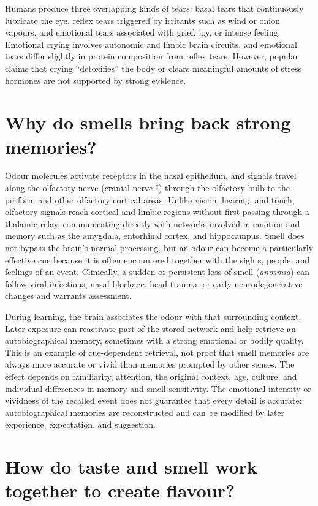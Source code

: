 \documentclass[11pt,oneside]{report}
\begin{document}
Humans produce three overlapping kinds of tears: basal tears that continuously
lubricate the eye, reflex tears triggered by irritants such as wind or onion
vapours, and emotional tears associated with grief, joy, or intense feeling.
Emotional crying involves autonomic and limbic brain circuits, and emotional
tears differ slightly in protein composition from reflex tears. However, popular
claims that crying ``detoxifies'' the body or clears meaningful amounts of
stress hormones are not supported by strong evidence.

\section{Why do smells bring back strong memories?}

Odour molecules activate receptors in the nasal epithelium, and signals travel
along the olfactory nerve (cranial nerve I) through the olfactory bulb to the
piriform and other olfactory cortical areas. Unlike vision, hearing, and touch,
olfactory signals reach cortical and limbic regions without first passing
through a thalamic relay, communicating directly with networks involved in
emotion and memory such as the amygdala, entorhinal cortex, and hippocampus.
Smell does not bypass the brain's normal processing, but an odour can become a
particularly effective cue because it is often encountered together with the
sights, people, and feelings of an event. Clinically, a sudden or persistent
loss of smell (\emph{anosmia}) can follow viral infections, nasal blockage, head
trauma, or early neurodegenerative changes and warrants assessment.

During learning, the brain associates the odour with that surrounding context.
Later exposure can reactivate part of the stored network and help retrieve an
autobiographical memory, sometimes with a strong emotional or bodily quality.
This is an example of cue-dependent retrieval, not proof that smell memories
are always more accurate or vivid than memories prompted by other senses. The
effect depends on familiarity, attention, the original context, age, culture,
and individual differences in memory and smell sensitivity. The emotional
intensity or vividness of the recalled event does not guarantee that every
detail is accurate: autobiographical memories are reconstructed and can be
modified by later experience, expectation, and suggestion.

\section{How do taste and smell work together to create flavour?}
\end{document}
